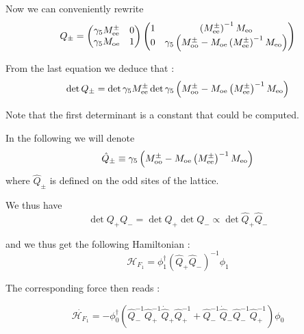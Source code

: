 \documentclass{article}[12pt]
\begin{document}
Now we can conveniently rewrite 
\begin{equation}
Q_{\pm} =  \begin{pmatrix} 
\gamma_5 M^{\pm}_{\rm{ee}}  & 0 \\ \gamma_5 M_{\rm{oe}} & 1\\
\end{pmatrix} \begin{pmatrix} 
1  &  \left(M^{\pm}_{\rm{ee}}\right)^{-1} M_{\rm{eo}} \\0 & \gamma_5
  \left(M^{\pm}_{\rm{oo}} - M_{\rm{oe}}
    \left(M^{\pm}_{\rm{ee}}\right)^{-1} M_{\rm{eo}} \right)\\
\end{pmatrix} 
\end{equation}


From the last equation we deduce that :
\begin{equation}
\det{Q_{\pm}} = \det{\gamma_5 M^{\pm}_{\rm{ee}} } \det{\gamma_5
  \left(M^{\pm}_{\rm{oo}} - M_{\rm{oe}}
    \left(M^{\pm}_{\rm{ee}}\right)^{-1} M_{\rm{eo}} \right)}
\end{equation}

Note that the first determinant is a constant that could be computed.

In the following we will denote 
\begin{equation}
\hat{Q}_{\pm} \equiv \gamma_5
  \left(M^{\pm}_{\rm{oo}} - M_{\rm{oe}}
    \left(M^{\pm}_{\rm{ee}}\right)^{-1} M_{\rm{eo}} \right)
\end{equation}
where $\hat{Q}_{\pm}$ is defined on the odd sites of the lattice. 


We thus have 
\begin{equation}
\det{Q_+ Q_-} = \det{Q_+}\det{Q_{-}}\propto\det{\hat{Q}_+ \hat{Q}_-} 
\end{equation}

and we thus get the following Hamiltonian :
\begin{equation}
\mathcal{H}_{F_1} = \phi_1^{\dagger} \left(\hat{Q}_+
    \hat{Q}_-\right)^{-1} \phi_1
\end{equation} 

The corresponding force then reads :

\begin{equation}
\dot{\mathcal{H}_{F_1}} = - \phi_{0}^\dagger\left(    \hat{Q}_-^{-1}
  \hat{Q}_+^{-1}  \dot{\hat{Q}}_+  \hat{Q}_+^{-1}  + \hat{Q}_{-}^{-1}
  \dot{\hat{Q}}_{-}  \hat{Q}_-^{-1}   \hat{Q}_+^{-1}    \right)    \phi_0
\end{equation}
\end{document}
